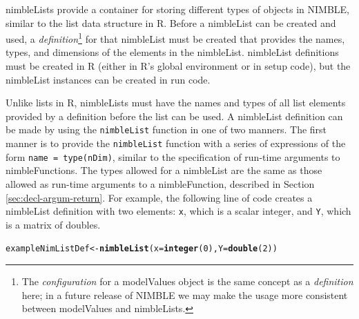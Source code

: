 \documentclass[12pt,oneside]{book}\usepackage[]{graphicx}\usepackage[]{color}
\makeatletter
\newcommand{\hlnum}[1]{\textcolor[rgb]{0.686,0.059,0.569}{#1}}%
\newcommand{\hlstd}[1]{\textcolor[rgb]{0.345,0.345,0.345}{#1}}%
\newcommand{\hlkwb}[1]{\textcolor[rgb]{0.69,0.353,0.396}{#1}}%
\newcommand{\hlkwc}[1]{\textcolor[rgb]{0.333,0.667,0.333}{#1}}%
\newcommand{\hlkwd}[1]{\textcolor[rgb]{0.737,0.353,0.396}{\textbf{#1}}}%
\newenvironment{kframe}{%
 \def\at@end@of@kframe{}%
 \ifinner\ifhmode%
  \def\at@end@of@kframe{\end{minipage}}%
  \begin{minipage}{\columnwidth}%
 \fi\fi%
 \def\FrameCommand##1{\hskip\@totalleftmargin \hskip-\fboxsep
 \colorbox{shadecolor}{##1}\hskip-\fboxsep
     \hskip-\linewidth \hskip-\@totalleftmargin \hskip\columnwidth}%
 \MakeFramed {\advance\hsize-\width
   \@totalleftmargin\z@ \linewidth\hsize
   \@setminipage}}%
 {\par\unskip\endMakeFramed%
 \at@end@of@kframe}
\newenvironment{knitrout}{}{} %
\def\cd#1{\texttt{#1}}
\def\nm#1{\textit{#1}}
\makeatother
\begin{document}
nimbleLists provide a container for storing different types of objects in NIMBLE, similar to the list data structure in R.  Before a nimbleList can be created and used, a \nm{definition}\footnote{The \nm{configuration} for a modelValues object is the same concept as a \nm{definition} here; in a future release of NIMBLE we may make the usage more consistent between modelValues and nimbleLists.} for that nimbleList must be created that provides the names, types, and dimensions of the elements in the nimbleList.  nimbleList definitions must be created in R (either in R's global environment or in setup code), but the nimbleList
instances can be created in run code.

Unlike lists in R, nimbleLists must have the names and types of all list elements provided by a definition before the list can be used.  A nimbleList definition can be made by using the \cd{nimbleList} function in one of two manners.  The first manner is to provide the \cd{nimbleList} function with a series of expressions of the form \cd{name = type(nDim)}, similar to the specification of run-time arguments to nimbleFunctions.  The types allowed for a nimbleList are the same as those allowed as run-time arguments to a nimbleFunction, described in Section \ref{sec:decl-argum-return}.  For example, the following line of code creates a nimbleList definition with two elements: \cd{x}, which is a scalar integer, and \cd{Y}, which is a matrix of doubles.
\begin{knitrout}
\color{fgcolor}\begin{kframe}
\begin{alltt}
 \hlstd{exampleNimListDef} \hlkwb{<-} \hlkwd{nimbleList}\hlstd{(}\hlkwc{x} \hlstd{=} \hlkwd{integer}\hlstd{(}\hlnum{0}\hlstd{),} \hlkwc{Y} \hlstd{=} \hlkwd{double}\hlstd{(}\hlnum{2}\hlstd{))}
\end{alltt}
\end{kframe}
\end{knitrout}
\end{document}
